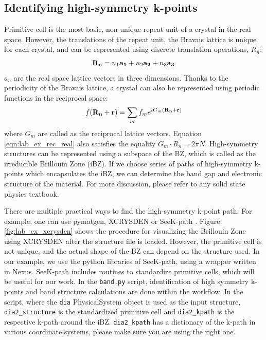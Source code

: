 \subsection{Identifying high-symmetry k-points}\label{sec:lab_ex_highk}
Primitive cell is the most basic, non-unique repeat unit of a crystal in the real space. 
However, the translations of the repeat unit, the Bravais lattice is unique for each crystal, and can be represented using discrete translation operations, $R_n$:
\begin{equation}
{\bf R_n} = n_1{\bf a_1} + n_2{\bf a_2} + n_3{\bf a_3}
\end{equation}
$a_n$ are the real space lattice vectors in three dimensions. Thanks to the periodicity of the Bravais lattice, a crystal can also be represented using periodic functions in the reciprocal space:
\begin{equation}
f({\bf R_n + r})= \sum_{m}f_me^{iG_m({\bf R_n+r})}\label{eqn:lab_ex_rec_real}
\end{equation}
where $G_m$ are called as the reciprocal lattice vectors. Equation \ref{eqn:lab_ex_rec_real} also satisfies the equality $G_m\cdot{R_n}=2{\pi}N$. High-symmetry structures can be represented using a subspace of the BZ, which is called as the irreducible Brillouin Zone (iBZ). If we choose series of  paths of high-symmetry k-points which encapsulates the iBZ, we can determine the band gap and electronic structure of the material. For more discussion, please refer to any solid state physics textbook. 

There are multiple practical ways to find the high-symmetry k-point path. 
For example, one can use pymatgen, \cite{Ong2013} XCRYSDEN \cite{Kokalj1999} or SeeK-path \cite{Hinuma2017}. 
Figure \ref{fig:lab_ex_xcrysden} shows the procedure for visualizing the Brillouin Zone using XCRYSDEN after the structure file is loaded. 
However, the primitive cell is not unique, and the actual shape of the BZ can depend on the structure used. 
In our example, we use the python libraries of SeeK-path, using a wrapper written in Nexus. 
SeeK-path includes routines to standardize primitive cells, which will be useful for our work. 
In the \texttt{band.py} script, identification of high symmetry k-points and band structure calculations are done within the workflow. 
In the script, where the \texttt{dia} PhysicalSystem object is used as the input structure, \texttt{dia2\_structure} is the standardized primitive cell and \texttt{dia2\_kpath} is the respective k-path around the iBZ. 
\texttt{dia2\_kpath} has a dictionary of the k-path in various coordinate systems, please make sure you are using the right one. 

